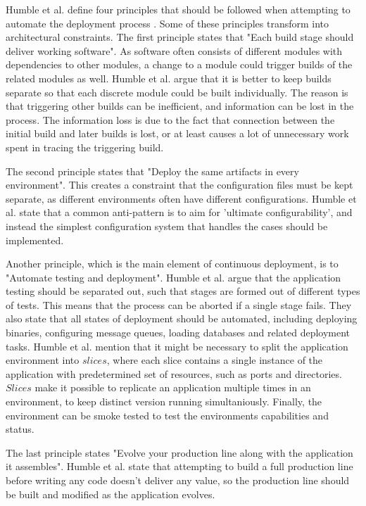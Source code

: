 \documentclass[conference]{IEEEtran}
\begin{document}
Humble et al. define four principles that should be followed when attempting to automate the deployment process \cite{humble2006deployment}. Some of these principles transform into architectural constraints. The first principle states that "Each build stage should deliver working software". As software often consists of different modules with dependencies to other modules, a change to a module could trigger builds of the related modules as well. Humble et al. argue that it is better to keep builds separate so that each discrete module could be built individually. The reason is that triggering other builds can be inefficient, and information can be lost in the process. The information loss is due to the fact that connection between the initial build and later builds is lost, or at least causes a lot of unnecessary work spent in tracing the triggering build. 

The second principle states that "Deploy the same artifacts in every environment". This creates a constraint that the configuration files must be kept separate, as different environments often have different configurations. Humble et al. state that a common anti-pattern is to aim for 'ultimate configurability', and instead the simplest configuration system that handles the cases should be implemented.

Another principle, which is the main element of continuous deployment, is to "Automate testing and deployment". Humble et al. argue that the application testing should be separated out, such that stages are formed out of different types of tests. This means that the process can be aborted if a single stage fails. They also state that all states of deployment should be automated, including deploying binaries, configuring message queues, loading databases and related deployment tasks. Humble et al. mention that it might be necessary to split the application environment into $slices$, where each slice contains a single instance of the application with predetermined set of resources, such as ports and directories. $Slices$ make it possible to replicate an application multiple times in an environment, to keep distinct version running simultaniously. Finally, the environment can be smoke tested to test the environments capabilities and status.

The last principle states "Evolve your production line along with the application it assembles". Humble et al. state that attempting to build a full production line before writing any code doesn't deliver any value, so the production line should be built and modified as the application evolves. 
\end{document}

